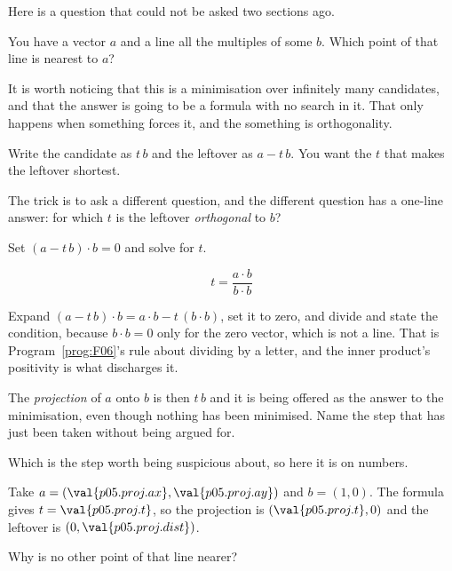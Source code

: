 \begin{fr}
Here is a question that could not be asked two sections ago.

You have a vector $a$ and a line \dash{} all the multiples of some $b$. Which
point of that line is nearest to $a$?

It is worth noticing that this is a minimisation over infinitely many
candidates, and that the answer is going to be a formula with no search in it.
That only happens when something forces it, and the something is
orthogonality.
\end{fr}

\begin{fr}
Write the candidate as $t\,b$ and the leftover as $a - t\,b$. You want the $t$
that makes the leftover shortest.

The trick is to ask a different question, and the different question has a
one-line answer: for which $t$ is the leftover \emph{orthogonal} to $b$?

Set $(a - t\,b) \cdot b = 0$ and solve for $t$.
\dotline
\nextframe
\end{fr}

\begin{fr}
\begin{ansblock}
\[ t = \frac{a \cdot b}{b \cdot b} \]
\end{ansblock}

Expand $(a - t\,b) \cdot b = a \cdot b - t\,(b \cdot b)$, set it to zero, and
divide \dash{} and state the condition, because $b \cdot b = 0$ only for the
zero vector, which is not a line. That is Program~\ref{prog:F06}'s rule about
dividing by a letter, and the inner product's positivity is what discharges it.

The \emph{projection} of $a$ onto $b$ is then $t\,b$ \dash{} and it is being
offered as the answer to the minimisation, even though nothing has been
minimised. Name the step that has just been taken without being argued for.
\dotline
\nextframe
\end{fr}

\begin{fr}
Which is the step worth being suspicious about, so here it is on numbers.

Take $a = (\val{p05.proj.ax}, \val{p05.proj.ay})$ and $b = (1, 0)$. The formula
gives $t = \val{p05.proj.t}$, so the projection is
$(\val{p05.proj.t}, 0)$ and the leftover is $(0, \val{p05.proj.dist})$.

Why is no other point of that line nearer?
\nextframe
\end{fr}

